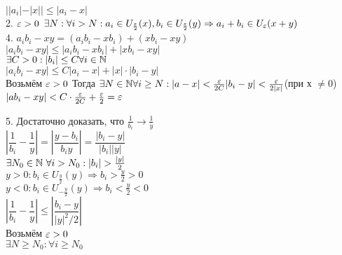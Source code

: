 $ | | a_i | - | x| | \leq | a_i - x | $ \\
2. $ \varepsilon > 0$
$\exists N:  \forall i > N: a_i \in U_{\frac{\varepsilon}{2}} (x) , b_i \in U_{\frac{\varepsilon}{2}} (y) \Rightarrow a_i + b_i \in U_{\varepsilon}(x+y) $ \\
4. $  a_i b_i - xy = (a_i b_i - xb_i) + ( xb_i - xy )$ \\
$ | a_i b_i - xy | \leq  |a_i b_i - xb_i| + | xb_i - xy | $ \\ 
$ \exists C > 0 : | b_i | \leq C \forall i \in \mathbb{N} $ \\
$ | a_i b_i - xy | \leq C | a_i - x| + |x | \cdot | b_i - y | $\\
Возьмём $\varepsilon > 0 $ 
Тогда $ \exists N \in \mathbb{N} \forall i \geq N :\\ |a - x| < 
\frac{\varepsilon}{2C} \\
|b_i - y | < \frac{\varepsilon}{2|x|} $(при х $\neq 0$)\\
$ |ab_i - xy| < C \cdot \frac{\varepsilon}{2C} + \frac{\varepsilon}{2} = \varepsilon $

5. Достаточно доказать, что $\frac{1}{b_i} \rightarrow \frac{1}{y}$ \\
$|\dfrac{1}{b_i} - \dfrac{1}{y}| = |\dfrac{y-b_i}{b_i y}| = \dfrac{|b_i - y|}{|b_i||y|}$ 	\\
$ \exists  N_0 \in \mathbb{N} \ \forall i > N_0 : |b_i| > \frac{|y|}{2} $\\
$ y > 0 : b_i \in U_{\frac{y}{2}}(y) \Rightarrow b_i  > \frac{y}{2} > 0 $\\
$ y < 0	:  b_i \in U_{-\frac{y}{2}}(y) \Rightarrow b_i  < \frac{y}{2} < 0 $ \\
$ |\dfrac{1}{b_i} - \dfrac{1}{y}| \leq |\dfrac{b_i - y}{|y|^2 / 2}| $ \\
Возьмём $ \varepsilon > 0 $\\
$ \exists N \geq N_0 : \forall i \geq N_0 $

